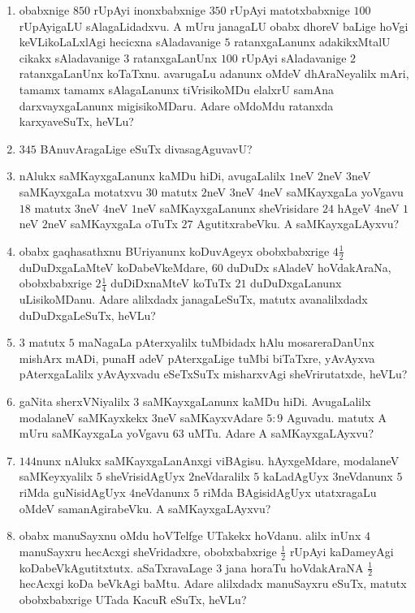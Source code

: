 \begin{enumerate}
\item obabxnige $850$ rUpAyi inonxbabxnige $350$ rUpAyi matotxbabxnige
$100$ rUpAyigaLU sAlagaLidadxvu. A mUru janagaLU obabx dhoreV baLige
hoVgi keVLikoLaLxlAgi hecicxna sAladavanige $5$ ratanxgaLanunx
adakikxMtalU cikakx sAladavanige $3$ ratanxgaLanUnx $100$ rUpAyi
sAladavanige $2$ ratanxgaLanUnx koTaTxnu. avarugaLu adanunx oMdeV
dhAraNeyalilx mAri, tamamx tamamx sAlagaLanunx tiVrisikoMDu elalxrU
samAna darxvayxgaLanunx migisikoMDaru. Adare oMdoMdu ratanxda
karxyaveSuTx, heVLu?

\item $345$ BAnuvAragaLige eSuTx divasagAguvavU?

\item nAlukx saMKayxgaLanunx kaMDu hiDi, avugaLalilx $1$neV $2$neV
$3$neV saMKayxgaLa motatxvu $30$ matutx $2$neV $3$neV $4$neV
saMKayxgaLa yoVgavu $18$ matutx $3$neV $4$neV $1$neV saMKayxgaLanunx
sheVrisidare $24$ hAgeV $4$neV $1$neV $2$neV saMKayxgaLa oTuTx $27$
AgutitxrabeVku. A saMKayxgaLAyxvu?

\item obabx gaqhasathxnu BUriyanunx koDuvAgeyx obobxbabxrige
$4\frac{1}{2}$ duDuDxgaLaMteV koDabeVkeMdare, $60$ duDuDx sAladeV
hoVdakAraNa, obobxbabxrige $2 \frac{1}{4}$ duDiDxnaMteV koTuTx $21$
duDuDxgaLanunx uLisikoMDanu. Adare alilxdadx janagaLeSuTx, matutx
avanalilxdadx duDuDxgaLeSuTx, heVLu?

\item $3$ matutx $5$ maNagaLa pAterxyalilx tuMbidadx hAlu
mosareraDanUnx mishArx mADi, punaH adeV pAterxgaLige tuMbi biTaTxre,
yAvAyxva pAterxgaLalilx yAvAyxvadu eSeTxSuTx misharxvAgi
sheVrirutatxde, heVLu?

\item gaNita sherxVNiyalilx $3$ saMKayxgaLanunx kaMDu
hiDi. AvugaLalilx modalaneV saMKayxkekx $3$neV saMKayxvAdare $5:9$
Aguvadu. matutx A mUru saMKayxgaLa yoVgavu $63$ uMTu. Adare A
saMKayxgaLAyxvu? 

\item $144$nunx nAlukx saMKayxgaLanAnxgi viBAgisu. hAyxgeMdare,
modalaneV saMKeyxyalilx $5$ sheVrisidAgUyx $2$neVdaralilx $5$
kaLadAgUyx $3$neVdanunx $5$ riMda guNisidAgUyx $4$neVdanunx $5$ riMda
BAgisidAgUyx utatxragaLu oMdeV samanAgirabeVku. A saMKayxgaLAyxvu?

\item obabx manuSayxnu oMdu hoVTelfge UTakekx hoVdanu. alilx inUnx $4$
manuSayxru hecAcxgi sheVridadxre, obobxbabxrige $\frac{1}{2}$ rUpAyi
kaDameyAgi koDabeVkAgutitxtutx. aSaTxravaLage $3$ jana horaTu
hoVdakAraNA $\frac{1}{2}$ hecAcxgi koDa beVkAgi baMtu. Adare alilxdadx
manuSayxru eSuTx, matutx obobxbabxrige UTada KacuR eSuTx, heVLu?


\end{enumerate}
